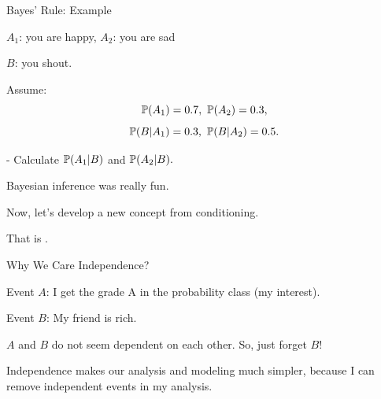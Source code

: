 \documentclass[handout,fleqn,aspectratio=169]{beamer}
\begin{document}
\begin{frame}{Bayes' Rule: Example}

{
\plitemsep 0.1in
\bci 

\item $A_1$: you are happy, $A_2$: you are sad
\item $B$: you shout. 

\item Assume: 
$$
\cprob{A_1}=0.7, \ \cprob{A_2}=0.3,
$$
$$
\mathbb{P}( B | A_1 ) = 0.3, \ \mathbb{P}( B | A_2 )=0.5.
$$

\eci 
}
{
\medskip

- Calculate $\mathbb{P}( A_1 | B )$ and $\mathbb{P}( A_2 | B ).$


}

 

\end{frame}

\begin{frame}{}
\vspace{2cm}
\LARGE Bayesian inference was really fun. 

\medskip

Now, let's develop a new concept from conditioning. 

\medskip

\LARGE That is . 

\end{frame}

\begin{frame}{Why We Care Independence?}

\plitemsep 0.1in
\bci 

\item<2-> Event $A$: I get the grade A in the probability class (my interest).
\item<2-> Event $B$: My friend is rich. 

\bigskip
\item<3-> $A$ and $B$ do not seem dependent on each other. So, just forget $B$!

\item<4-> Independence makes our analysis and modeling much simpler, because I can remove independent events in my analysis.  
\eci 
\end{frame}
\end{document}
